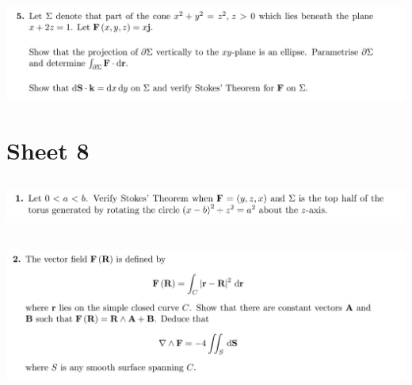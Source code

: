 \documentclass[12pt]{article}
\begin{document}
\subsection{}
\begin{mdframed}
  \includegraphics[width=400pt]{img/oxford-prelims-M5-multivariable-calc-7-5.png}
\end{mdframed}


\newpage
\section{Sheet 8}

\subsection{}
\begin{mdframed}
  \includegraphics[width=400pt]{img/oxford-prelims-M5-multivariable-calc-8-1.png}
\end{mdframed}

\subsection{}
\begin{mdframed}
  \includegraphics[width=400pt]{img/oxford-prelims-M5-multivariable-calc-8-2.png}
\end{mdframed}
\end{document}
